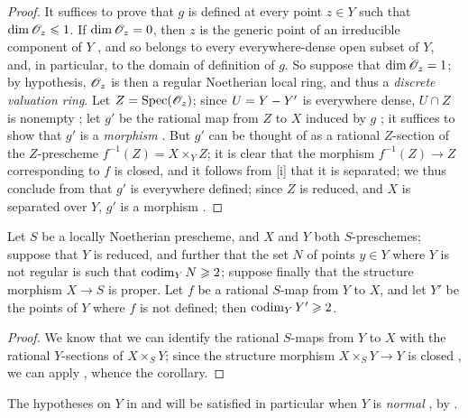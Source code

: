 \begin{proof}
It suffices to prove that $g$ is defined at every point $z\in Y$ such that $\dim\mathscr{O}_z\leqslant1$.
If $\dim\mathscr{O}_z=0$, then $z$ is the generic point of an irreducible component of $Y$ , and so belongs to every everywhere-dense open subset of $Y$, and, in particular, to the domain of definition of $g$.
So suppose that $\dim\mathscr{O}_z=1$; by hypothesis, $\mathscr{O}_z$ is then a regular Noetherian local ring, and thus  a \emph{discrete valuation ring}.
Let $Z=\operatorname{Spec}(\mathscr{O}_z)$;
since $U=Y- Y'$ is everywhere dense, $U\cap Z$ is nonempty ;
let $g'$ be the rational map from $Z$ to $X$ induced by $g$ ;
it suffices to show that $g'$ is a \emph{morphism} .
But $g'$ can be thought of as a rational $Z$-section of the $Z$-prescheme $f^{-1}(Z)=X\times_Y Z$;
it is clear that the morphism $f^{-1}(Z)\to Z$ corresponding to $f$ is closed, and it follows from [i] that it is separated;
we thus conclude from  that $g'$ is everywhere defined;
since $Z$ is reduced, and $X$ is separated over $Y$, $g'$ is a morphism .
\end{proof}

\begin{corollary}[7.3.6]
\label{II.7.3.6}
Let $S$ be a locally Noetherian prescheme, and $X$ and $Y$ both $S$-preschemes;
suppose that $Y$ is reduced, and further that the set $N$ of points $y\in Y$ where $Y$ is not regular is such that $\operatorname{codim}_Y N\geqslant2$;
suppose finally that the structure morphism $X\to S$ is proper.
Let $f$ be a rational $S$-map from $Y$ to $X$, and let $Y'$ be the points of $Y$ where $f$ is not defined;
then $\operatorname{codim}_Y Y'\geqslant2$.
\end{corollary}

\begin{proof}
We know  that we can identify the rational $S$-maps from $Y$ to $X$ with the rational $Y$-sections of $X\times_S Y$;
since the structure morphism $X\times_S Y\to Y$ is closed , we can apply , whence the corollary.
\end{proof}

\begin{remark}[7.3.7]
\label{II.7.3.7}
The hypotheses on $Y$ in  and  will be satisfied in particular when $Y$ is \emph{normal} , by .
\end{remark}

